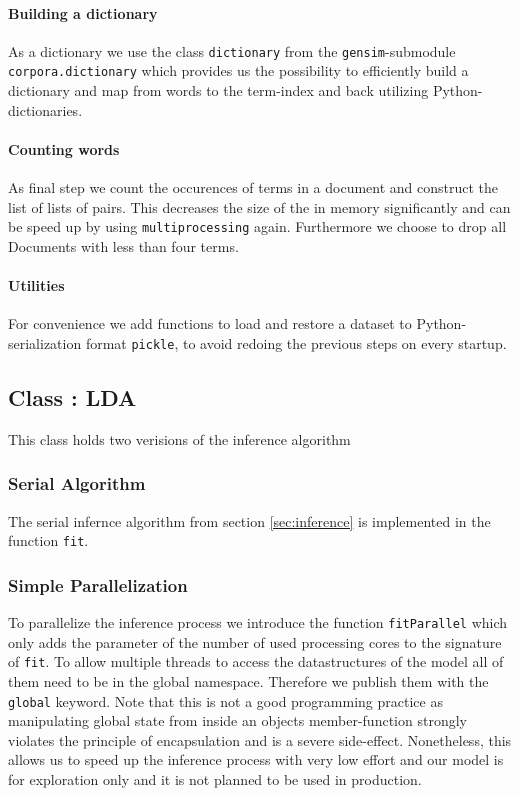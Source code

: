 \documentclass[12 pt,twopage]{article}
\begin{document}
\paragraph{Building a dictionary} As a dictionary we use the class \texttt{dictionary} from the \texttt{gensim}-submodule \texttt{corpora.dictionary} which provides us the possibility to efficiently build a dictionary and map from words to the term-index and back utilizing Python-dictionaries.
\paragraph{Counting words} As final step we count the occurences of terms in a document and construct the list of lists of pairs. This decreases the size of the in memory significantly and can be speed up by using \texttt{multiprocessing} again. Furthermore we choose to drop all Documents with less than four terms.
\paragraph{Utilities} For convenience we add functions to load and restore a dataset to Python-serialization format \texttt{pickle}, to avoid redoing the previous steps on every startup.



\subsection{Class : LDA}
This class holds two verisions of the inference algorithm
\subsubsection{Serial Algorithm}
The serial infernce algorithm from section \ref{sec:inference} is implemented in the function \texttt{fit}.
\subsubsection{Simple Parallelization}
To parallelize the inference process we introduce the function \texttt{fitParallel} which only adds the parameter of the number of used processing cores to the signature of \texttt{fit}. To allow multiple threads to access the datastructures of the model all of them need to be in the global namespace. Therefore we publish them with the  \texttt{global} keyword. Note that this is not a good programming practice as manipulating global state from inside an objects member-function strongly violates the principle of encapsulation and is a severe side-effect. Nonetheless, this allows us to speed up the inference process with very low effort and our model is for exploration only and it is not planned to be used in production.
\end{document}
